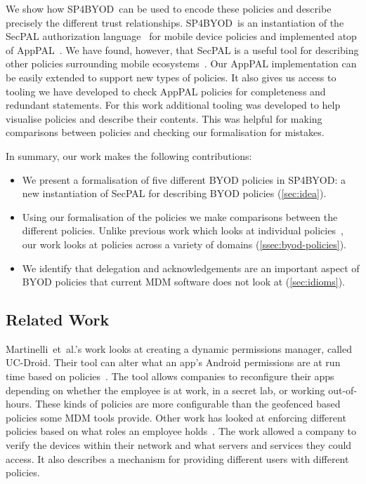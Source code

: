 \documentclass{llncs}
\makeatletter
\newcommand{\etal}{et~al.\@}
\newcommand{\AppPAL}[0]{SP4BYOD}
\makeatother
\begin{document}
We show how \AppPAL~can be used to encode these policies and describe precisely the different trust relationships.
\AppPAL~is an instantiation of the SecPAL authorization language~\cite{becker_secpal:_2010} for mobile device policies and implemented atop of AppPAL~\cite{hallett_apppal_2016}.
We have found, however, that SecPAL is a useful tool for describing other policies surrounding mobile ecosystems~\cite{hallett_specifying_2016}.
Our AppPAL implementation can be easily extended to support new types of policies.
It also gives us access to tooling we have developed to check AppPAL policies for completeness and redundant statements.
For this work additional tooling was developed to help visualise policies and describe their contents.
This was helpful for making comparisons between policies and checking our formalisation for mistakes. 


In summary, our work makes the following contributions:
\begin{itemize}[topsep=0pt]
  \item We present a formalisation of five different BYOD policies in \AppPAL: a new instantiation of SecPAL for describing BYOD policies (\autoref{sec:idea}).
  \item Using our formalisation of the policies we make comparisons between the different policies. 
    Unlike previous work which looks at individual policies~\cite{armando_developing_2016}, our work looks at policies across a variety of domains (\autoref{ssec:byod-policies}).
  \item We identify that delegation and acknowledgements are an important aspect of BYOD policies that current MDM software does not look at (\autoref{sec:idioms}).
\end{itemize}

\subsection{Related Work}
\label{sec:related}

Martinelli~\etal{}'s work looks at creating a dynamic permissions manager, called UC-Droid.
Their tool can alter what an app's Android permissions are at run time based on policies~\cite{martinelli_enhancing_2016}.
The tool allows companies to reconfigure their apps depending on whether the employee is at work, in a secret lab, or working out-of-hours.
These kinds of policies are more configurable than the geofenced based policies some \ac{MDM} tools provide.
Other work has looked at enforcing different policies based on what roles an employee holds~\cite{costantino_towards_2013}.
The work allowed a company to verify the devices within their network and what servers and services they could access.
It also describes a mechanism for providing different users with different policies.
\end{document}

